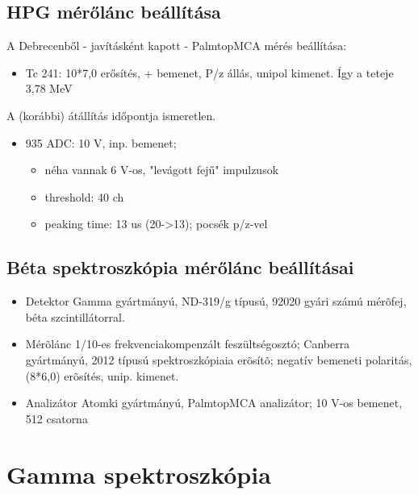 \documentclass[12pt,a4paper]{article}
\begin{document}
\subsection{HPG mérőlánc beállítása}
A Debrecenből - javításként kapott - PalmtopMCA mérés beállítása: \begin{itemize}
\item Tc 241: 
10*7,0 erősítés, + bemenet, P/z állás, unipol kimenet. Így a teteje 3,78 MeV
\end{itemize}
A (korábbi) átállítás időpontja ismeretlen.
\begin{itemize}
\item 935 ADC: 
10 V, inp. bemenet; 
\begin{itemize}
\item néha vannak 6 V-os, "levágott fejű" impulzusok
\item threshold: 40 ch
\item peaking time: 13 us (20->13); pocsék p/z-vel
\end{itemize}
\end{itemize}
\subsection{Béta spektroszkópia mérőlánc beállításai}
\begin{itemize}
\item Detektor
Gamma gyártmányú, ND-319/g típusú, 92020 gyári számú mérõfej, béta szcintillátorral.
\item Mérõlánc
1/10-es frekvenciakompenzált feszültségosztó;
Canberra gyártmányú, 2012 típusú spektroszkópiaia erõsítõ; 
negatív bemeneti polaritás, (8*6,0) erõsítés, unip. kimenet.
\item Analizátor
Atomki gyártmányú, PalmtopMCA analizátor; 
10 V-os bemenet, 512 csatorna
\end{itemize}
\newpage
\section{Gamma spektroszkópia}
\end{document}
